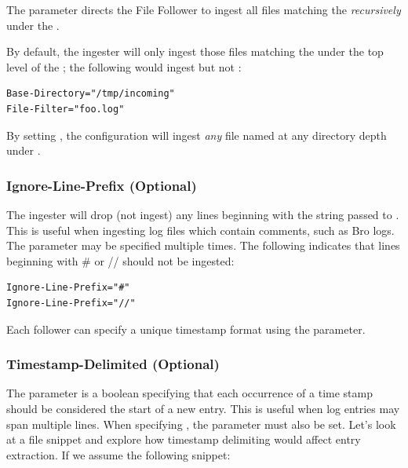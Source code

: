 The  parameter directs the File Follower to ingest all
files matching the  \emph{recursively} under the
.

By default, the ingester will only ingest those files matching the
 under the top level of the ; the
following would ingest  but not
:

\begin{Verbatim}[breaklines=true]
Base-Directory="/tmp/incoming"
File-Filter="foo.log"
\end{Verbatim}

By setting , the configuration will ingest
\emph{any} file named  at any directory depth under
.

\subsubsection{Ignore-Line-Prefix (Optional)}

The ingester will drop (not ingest) any lines beginning with the string
passed to . This is useful when ingesting log
files which contain comments, such as Bro logs. The
 parameter may be specified multiple times. The
following indicates that lines beginning with \# or // should not be
ingested:

\begin{Verbatim}[breaklines=true]
Ignore-Line-Prefix="#"
Ignore-Line-Prefix="//"
\end{Verbatim}

Each follower can specify a unique timestamp format using the
 parameter.

\subsubsection{Timestamp-Delimited (Optional)}

The  parameter is a boolean specifying that each
occurrence of a time stamp should be considered the start of a new
entry. This is useful when log entries may span multiple lines. When
specifying , the
 parameter must also be set. Let's look at
a file snippet and explore how timestamp delimiting would affect entry
extraction. If we assume the following snippet:

